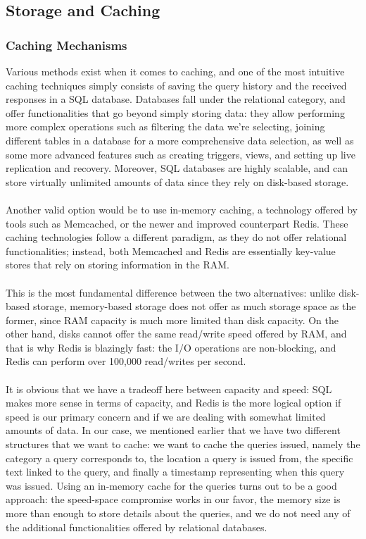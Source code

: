 \subsection{Storage and Caching}
\subsubsection{Caching Mechanisms}
Various methods exist when it comes to caching, and one of the most intuitive caching techniques simply consists of saving the query history and the received responses in a SQL database. Databases fall under the relational category, and offer functionalities that go beyond simply storing data: they allow performing more complex operations such as filtering the data we're selecting, joining different tables in a database for a more comprehensive data selection, as well as some more advanced features such as creating triggers, views, and setting up live replication and recovery. Moreover, SQL databases are highly scalable, and can store virtually unlimited amounts of data since they rely on disk-based storage.\\\\
Another valid option would be to use in-memory caching, a technology offered by tools such as Memcached, or the newer and improved counterpart Redis. These caching technologies follow a different paradigm, as they do not offer relational functionalities; instead, both Memcached and Redis are essentially key-value stores that rely on storing information in the RAM.\\\\
This is the most fundamental difference between the two alternatives: unlike disk-based storage, memory-based storage does not offer as much storage space as the former, since RAM capacity is much more limited than disk capacity. On the other hand, disks cannot offer the same read/write speed offered by RAM, and that is why Redis is blazingly fast: the I/O operations are non-blocking, and Redis can perform over 100,000 read/writes per second.\\\\
It is obvious that we have a tradeoff here between capacity and speed: SQL makes more sense in terms of capacity, and Redis is the more logical option if speed is our primary concern and if we are dealing with somewhat limited amounts of data. In our case, we mentioned earlier that we have two different structures that we want to cache: we want to cache the queries issued, namely the category a query corresponds to, the location a query is issued from, the specific text linked to the query, and finally a timestamp representing when this query was issued. Using an in-memory cache for the queries turns out to be a good approach: the speed-space compromise works in our favor, the memory size is more than enough to store details about the queries, and we do not need any of the additional functionalities offered by relational databases.\\\\
